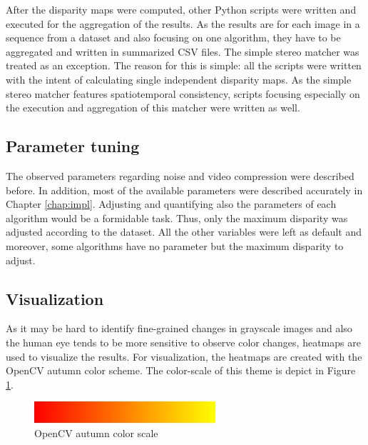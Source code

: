 After the disparity maps were computed, other Python scripts were written and executed for the aggregation of the results.
As the results are for each image in a sequence from a dataset and also focusing on one algorithm, they have to be aggregated and written in summarized CSV files.
The simple stereo matcher was treated as an exception.
The reason for this is simple: all the scripts were written with the intent of calculating single independent disparity maps.
As the simple stereo matcher features spatiotemporal consistency, scripts focusing especially on the execution and aggregation of this matcher were written as well.

\subsection*{Parameter tuning}

The observed parameters regarding noise and video compression were described before.
In addition, most of the available parameters were described accurately in Chapter \ref{chap:impl}.
Adjusting and quantifying also the parameters of each algorithm would be a formidable task.
Thus, only the maximum disparity was adjusted according to the dataset.
All the other variables were left as default and moreover, some algorithms have no parameter but the maximum disparity to adjust.

\subsection*{Visualization}

As it may be hard to identify fine-grained changes in grayscale images and also the human eye tends to be more sensitive to observe color changes, heatmaps are used to visualize the results.
For visualization, the heatmaps are created with the OpenCV autumn color scheme.
The color-scale of this theme is depict in Figure \ref{fig:colorscale}.

\begin{figure}[h!]
  \centering
  \includegraphics[width=0.6\textwidth]{src/images/colorscale.png}
  \caption[OpenCV autumn color scale]{OpenCV autumn color scale\protect\footnotemark}
  \label{fig:colorscale}
\end{figure}


